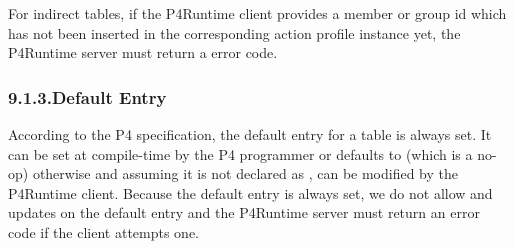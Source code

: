 \documentclass[11pt]{article}
\begin{document}
{%
\noindent{}For indirect tables, if the P4Runtime client provides a member or group id which
has not been inserted in the corresponding action profile instance yet, the
P4Runtime server must return a  error code.%

\subsubsection{9.1.3.\hspace*{0.5em}Default Entry}\label{sec-default-entry}%

\noindent{}According to the P4 specification, the default entry for a table is always set.
It can be set at compile-time by the P4 programmer \textemdash{} or defaults to 
(which is a no-op) otherwise \textemdash{} and assuming it is not declared as , can
be modified by the P4Runtime client. Because the default entry is always set, we
do not allow  and  updates on the default entry and the
P4Runtime server must return an  error code if the client
attempts one.%

}
\end{document}
